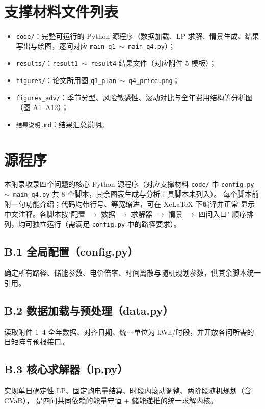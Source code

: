 \documentclass[withoutpreface]{cumcmthesis}
\begin{document}
\begin{appendices}

\section{支撑材料文件列表}
\begin{itemize}
    \item \texttt{code/}：完整可运行的 Python 源程序（数据加载、LP 求解、情景生成、结果
          写出与绘图，逐问对应 \texttt{main\_q1}~$\sim$~\texttt{main\_q4.py}）；
    \item \texttt{results/}：\texttt{result1}~$\sim$~\texttt{result4} 结果文件（对应附件 5 模板）；
    \item \texttt{figures/}：论文所用图 \texttt{q1\_plan}~$\sim$~\texttt{q4\_price.png}；
    \item \texttt{figures\_adv/}：季节分型、风险敏感性、滚动对比与全年费用结构等分析图（图 A1--A12）；
    \item \texttt{结果说明.md}：结果汇总说明。
\end{itemize}

\section{源程序}
本附录收录四个问题的核心 Python 源程序（对应支撑材料 \texttt{code/} 中
\texttt{config.py}~$\sim$~\texttt{main\_q4.py} 共 8 个脚本，其余图表生成与分析工具脚本未列入）。
每个脚本前附一句功能介绍；代码均带行号、等宽缩进，可在 XeLaTeX 下编译并正常
显示中文注释。各脚本按"配置 $\rightarrow$ 数据 $\rightarrow$ 求解器 $\rightarrow$ 情景 $\rightarrow$ 四问入口"
顺序排列，均可独立运行（需满足 \texttt{config.py} 中的路径要求）。

\subsection{B.1 全局配置（config.py）}\label{app:config}
确定所有路径、储能参数、电价倍率、时间离散与随机规划参数，供其余脚本统一引用。


\subsection{B.2 数据加载与预处理（data.py）}\label{app:data}
读取附件 1--4 全年数据、对齐日期、统一单位为 kWh/时段，并开放各问所需的日矩阵与预报接口。


\subsection{B.3 核心求解器（lp.py）}\label{app:lp}
实现单日确定性 LP、固定购电量结算、时段内滚动调整、两阶段随机规划（含 CVaR），
是四问共同依赖的能量守恒 + 储能递推的统一求解内核。



\end{appendices}
\end{document}
